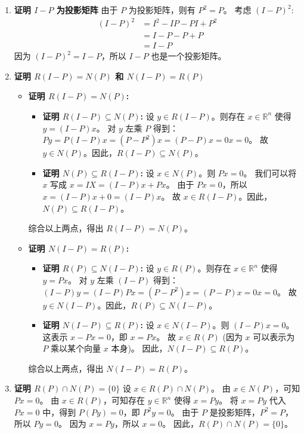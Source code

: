 \documentclass[12pt, a4paper]{article}
\begin{document}
\begin{enumerate}
    \item \textbf{证明 $I-P$ 为投影矩阵}
    由于 $P$ 为投影矩阵，则有 $P^2 = P$。
    考虑 $(I-P)^2$:
    \begin{align*}
    (I-P)^2 &= I^2 - IP - PI + P^2 \\
             &= I - P - P + P \\
             &= I - P
    \end{align*}
    因为 $(I-P)^2 = I-P$，所以 $I-P$ 也是一个投影矩阵。

    \item \textbf{证明 $R(I-P) = N(P)$ 和 $N(I-P) = R(P)$}
    \begin{itemize}
        \item \textbf{证明 $R(I-P) = N(P)$:}
        \begin{itemize}
            \item \textbf{证明 $R(I-P) \subseteq N(P)$:}
            设 $y \in R(I-P)$。则存在 $x \in \mathbb{R}^n$ 使得 $y=(I-P)x$。
            对 $y$ 左乘 $P$ 得到：
            $Py = P(I-P)x = (P-P^2)x = (P-P)x = 0x = 0$。
            故 $y \in N(P)$。因此，$R(I-P) \subseteq N(P)$。

            \item \textbf{证明 $N(P) \subseteq R(I-P)$:}
            设 $x \in N(P)$。则 $Px = 0$。
            我们可以将 $x$ 写成 $x = IX = (I-P)x + Px$。
            由于 $Px=0$，所以 $x = (I-P)x + 0 = (I-P)x$。
            故 $x \in R(I-P)$。因此，$N(P) \subseteq R(I-P)$。
        \end{itemize}
        综合以上两点，得出 $R(I-P) = N(P)$。

        \item \textbf{证明 $N(I-P) = R(P)$:}
        \begin{itemize}
            \item \textbf{证明 $R(P) \subseteq N(I-P)$:}
            设 $y \in R(P)$。则存在 $x \in \mathbb{R}^n$ 使得 $y=Px$。
            对 $y$ 左乘 $(I-P)$ 得到：
            $(I-P)y = (I-P)Px = (P-P^2)x = (P-P)x = 0x = 0$。
            故 $y \in N(I-P)$。因此，$R(P) \subseteq N(I-P)$。

            \item \textbf{证明 $N(I-P) \subseteq R(P)$:}
            设 $x \in N(I-P)$。则 $(I-P)x = 0$。
            这表示 $x - Px = 0$，即 $x = Px$。
            故 $x \in R(P)$ (因为 $x$ 可以表示为 $P$ 乘以某个向量 $x$ 本身)。
            因此，$N(I-P) \subseteq R(P)$。
        \end{itemize}
        综合以上两点，得出 $N(I-P) = R(P)$。
    \end{itemize}

    \item \textbf{证明 $R(P) \cap N(P) = \{0\}$}
    设 $x \in R(P) \cap N(P)$。
    由 $x \in N(P)$，可知 $Px = 0$。
    由 $x \in R(P)$，可知存在 $y \in \mathbb{R}^n$ 使得 $x = Py$。
    将 $x=Py$ 代入 $Px=0$ 中，得到 $P(Py)=0$，即 $P^2y=0$。
    由于 $P$ 是投影矩阵，$P^2=P$，所以 $Py=0$。
    因为 $x=Py$，所以 $x=0$。
    因此，$R(P) \cap N(P) = \{0\}$。
\end{enumerate}
\end{document}
